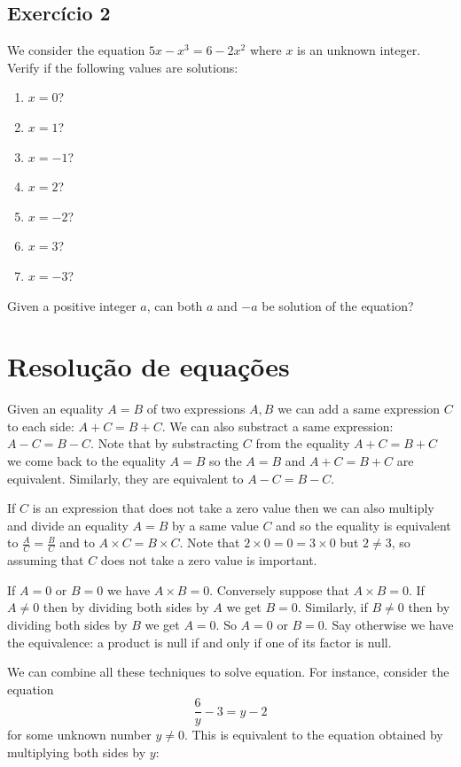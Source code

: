 \subsection*{Exercício 2}

We consider the equation $5x - x^3 = 6 - 2x^2$ where $x$ is an unknown integer.
Verify if the following values are solutions:

\begin{enumerate}
\item $x=0$?
\item $x=1$?
\item $x=-1$?
\item $x=2$?
\item $x=-2$?
\item $x=3$?
\item $x=-3$?
\end{enumerate}

Given a positive integer $a$, can both $a$ and $-a$ be solution of the equation?

\section{Resolução de equações}

Given an equality $A = B$ of two expressions $A,B$ we can add a same expression
$C$ to each side: $A + C = B + C$. We can also substract
a same expression: $A - C = B - C$. Note that by substracting $C$ from the
equality $A + C = B + C$ we come back to the equality $A = B$ so
the $A = B$ and $A + C = B + C$ are equivalent. Similarly, they are
equivalent to $A - C = B - C$.

If $C$ is an expression that does not take a zero value then we can
also multiply and divide an equality $A = B$ by a same value $C$ and
so the equality is equivalent to $\frac{A}{C} = \frac{B}{C}$ and to
$A \times C  = B \times C$. Note that $2 \times 0 = 0 = 3 \times 0$
but $2 \neq 3$, so assuming that $C$ does not take a zero value is important.

If $A = 0$ or $B = 0$ we have $A \times B = 0$. Conversely suppose
that $A \times B = 0$. If $A \neq 0$ then by dividing both sides by $A$
we get $B=0$. Similarly, if $B \neq 0$ then by dividing both sides by $B$
we get $A=0$. So $A=0$ or $B=0$. Say otherwise we have the equivalence:
a product is null if and only if one of its factor is null.

We can combine all these techniques to solve equation. For instance,
consider the equation
$$\frac{6}{y} -3 = y - 2$$
for some unknown number $y \neq 0$. This is equivalent to the equation
obtained by multiplying both sides by $y$:

